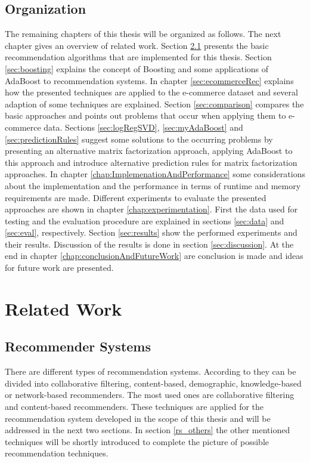 \documentclass[10pt]{reportMaster}
\begin{document}
\section{Organization}
The remaining chapters of this thesis will be organized as follows.
The next chapter gives an overview of related work.
Section \ref{sec:recommenderSystems} presents the basic recommendation algorithms that are implemented for this thesis.
Section \ref{sec:boosting} explains the concept of Boosting and some applications of AdaBoost to recommendation systems.
In chapter \ref{sec:ecommerceRec} explains how the presented techniques are applied to the e-commerce dataset and several adaption of some techniques are explained.
Section \ref{sec:comparison} compares the basic approaches and points out problems that occur when applying them to e-commerce data.
Sections \ref{sec:logRegSVD}, \ref{sec:myAdaBoost} and \ref{sec:predictionRules} suggest some solutions to the occurring problems by presenting an alternative matrix factorization approach, applying AdaBoost to this approach and introduce alternative prediction rules for matrix factorization approaches. 
In chapter \ref{chap:ImplemenationAndPerformance} some considerations about the implementation and the performance in terms of runtime and memory requirements are made.
Different experiments to evaluate the presented approaches are shown in chapter \ref{chap:experimentation}.
First the data used for testing and the evaluation procedure are explained in sections \ref{sec:data} and \ref{sec:eval}, respectively.
Section \ref{sec:results} show the performed experiments and their results.
Discussion of the results is done in section \ref{sec:discussion}.
At the end in chapter \ref{chap:conclusionAndFutureWork} are conclusion is made and ideas for future work are presented.






\chapter{Related Work}
\label{sec:relatedWork}

\section{Recommender Systems}
\label{sec:recommenderSystems}
There are different types of recommendation systems.
According to \cite{hybridSurvey} they can be divided into collaborative filtering, content-based, demographic, knowledge-based or network-based recommenders.
The most used ones are collaborative filtering and content-based recommenders.
These techniques are applied for the recommendation system developed in the scope of this thesis and will be addressed in the next two sections.
In section \ref{rs_others} the other mentioned techniques will be shortly introduced to complete the picture of possible recommendation techniques.
\end{document}

